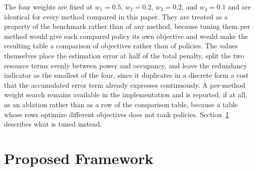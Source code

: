\documentclass[journal]{IEEEtran}
\begin{document}
The four weights are fixed at $w_1 = 0.5$, $w_2 = 0.2$, $w_3 = 0.2$, and $w_4 = 0.1$ and are identical for every method compared in this paper. They are treated as a property of the benchmark rather than of any method, because tuning them per method would give each compared policy its own objective and would make the resulting table a comparison of objectives rather than of policies. The values themselves place the estimation error at half of the total penalty, split the two resource terms evenly between power and occupancy, and leave the redundancy indicator as the smallest of the four, since it duplicates in a discrete form a cost that the accumulated error term already expresses continuously. A per-method weight search remains available in the implementation and is reported, if at all, as an ablation rather than as a row of the comparison table, because a table whose rows optimize different objectives does not rank policies. Section~\ref{sec:proposed} describes what is tuned instead.

\section{Proposed Framework}
\label{sec:proposed}

\end{document}
